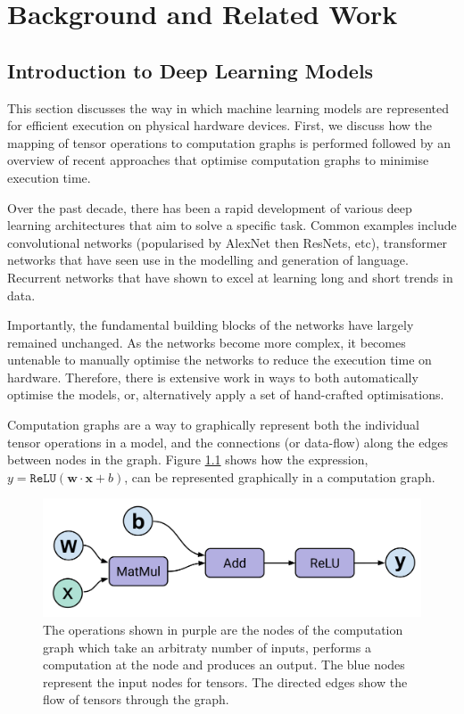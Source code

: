 \chapter{Background and Related Work}

\section{Introduction to Deep Learning Models}
This section discusses the way in which machine learning models are represented for efficient execution on physical hardware devices. First, we discuss how the mapping of tensor operations to computation graphs is performed followed by an overview of recent approaches that optimise computation graphs to minimise execution time.

Over the past decade, there has been a rapid development of various deep learning architectures that aim to solve a specific task. Common examples include convolutional networks (popularised by AlexNet then ResNets, etc), transformer networks that have seen use in the modelling and generation of language. Recurrent networks that have shown to excel at learning long and short trends in data.

Importantly, the fundamental building blocks of the networks have largely remained unchanged.  As the networks become more complex, it becomes untenable to manually optimise the networks to reduce the execution time on hardware. Therefore, there is extensive work in ways to both automatically optimise the models, or, alternatively apply a set of hand-crafted optimisations.

Computation graphs are a way to graphically represent both the individual tensor operations in a model, and the connections (or data-flow) along the edges between nodes in the graph. Figure \ref{fig:bg:perceptron} shows how the expression, $y = \texttt{ReLU}(\mathbf{w} \cdot \mathbf{x} + b)$, can be represented graphically in a computation graph.

\begin{figure}[ht]
  \centering
  \includegraphics[width=0.75\columnwidth]{sections/2background/images/bitmap}
  \caption[Single perceptron as a dataflow (computation) graph]{The operations shown in purple are the nodes of the computation graph which take an arbitraty number of inputs, performs a computation at the node and produces an output. The blue nodes represent the input nodes for tensors. The directed edges show the flow of tensors through the graph.}
  \label{fig:bg:perceptron}
\end{figure}

